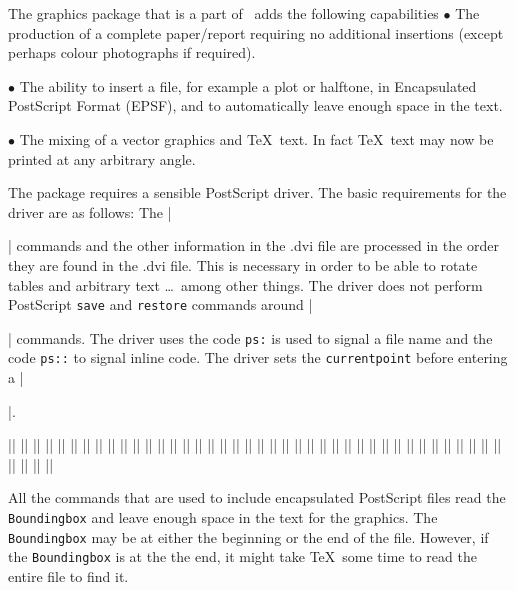   \relax \fi %
\def\cqu{}





The graphics package that is a part of \intex\ 
adds the following
capabilities 
\bl
\li $\bullet$ The production of a complete paper/report requiring no
additional insertions (except perhaps colour photographs if required).

\li $\bullet$ The ability to insert a file, for example a plot or halftone,
in Encapsulated PostScript Format (EPSF), and to automatically leave enough
space in the text. 

\li $\bullet$ The mixing of a vector graphics and \TeX\
text. In fact \TeX\ text may now be printed at any arbitrary angle.

\el

The package requires a sensible PostScript driver. The basic requirements
for the driver are as follows:
\bl
\lb The |\special| commands and the other information in the .dvi file are
processed in the order they are found in the .dvi file. This is necessary
in order to be able to rotate tables and arbitrary text \dots\ among other
things.
\lb The driver does not perform PostScript {\tt save} and {\tt restore}
commands around |\special| commands.
\lb The driver uses the code {\tt ps:} is used to signal a file name and
the code {\tt ps::} to signal inline code.
\lb The driver sets the {\tt currentpoint} before entering a |\special|.
\el 

\begintwocolumn
\ext|\absoluteposition|
\ext|\absolutescale|
\ext|\arcc|
\ext|\arcn|
\ext|\arrowheadscale|
\ext|\arrowheadsize|
\ext|\arrowheadtype|
\ext|\avec|
\ext|\beginsegment|
\ext|\beginTeXgraph \btg|
\ext|\cavec|
\ext|\cav|
\ext|\centergraph|
\ext|\centerplotfile|
\ext|\clvec|
\ext|\clv|
\ext|\endsegment|
\ext|\endTeXgraph \etg|
\ext|\graphdim|
\ext|\hgraphsize|
\ext|\hgraphskip|
\ext|\hpix|
\ext|\htext|
\ext||
\ext|\incscfile|
\ext|\incscmvfile|
\ext|\larc|
\ext|\lcir|
\ext|\linecap|
\ext|\linejoin|
\ext|\lpatt|
\ext|\lvec|
\ext|\move|
\ext|\penwidth|
\ext|\relativeposition|
\ext|\relativescale|
\ext|\rstext|
\ext|\rtext|
\ext|\segmentscale|
\ext|\unitscale|
\ext|\vgraphsize|
\ext|\vgraphskip|
\ext|\vpix|
\ext|\vtext|
\endtwocolumn

All the commands that are used to include encapsulated PostScript files
read the {\tt Boundingbox} and leave enough space in the text for the
graphics. The {\tt Boundingbox} may be at either the beginning or the end
of the  file. However, if the {\tt Boundingbox} is at the the end, it might
take \TeX\ some time to read the entire file to find it.

